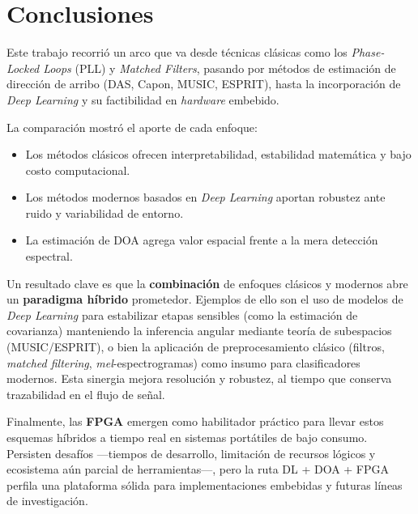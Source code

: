 \section{Conclusiones}\label{sec:conclusiones}

Este trabajo recorrió un arco que va desde técnicas clásicas como los 
\emph{Phase-Locked Loops} (PLL) y \emph{Matched Filters}, pasando por métodos de estimación de dirección de arribo (DAS, Capon, MUSIC, ESPRIT), hasta la incorporación de \emph{Deep Learning} y su factibilidad en \emph{hardware} embebido.  

La comparación mostró el aporte de cada enfoque:  
\begin{itemize}
	\item Los métodos clásicos ofrecen interpretabilidad, estabilidad matemática y bajo costo computacional.  
	\item Los métodos modernos basados en \emph{Deep Learning} aportan robustez ante ruido y variabilidad de entorno.  
	\item La estimación de DOA agrega valor espacial frente a la mera detección espectral.  
\end{itemize}

Un resultado clave es que la \textbf{combinación} de enfoques clásicos y modernos abre un \textbf{paradigma híbrido} prometedor.  
Ejemplos de ello son el uso de modelos de \emph{Deep Learning} para estabilizar etapas sensibles (como la estimación de covarianza) manteniendo la inferencia angular mediante teoría de subespacios (MUSIC/ESPRIT), o bien la aplicación de preprocesamiento clásico (filtros, \emph{matched filtering}, \emph{mel}-espectrogramas) como insumo para clasificadores modernos.  
Esta sinergia mejora resolución y robustez, al tiempo que conserva trazabilidad en el flujo de señal.

Finalmente, las \textbf{FPGA} emergen como habilitador práctico para llevar estos esquemas híbridos a tiempo real en sistemas portátiles de bajo consumo.  
Persisten desafíos —tiempos de desarrollo, limitación de recursos lógicos y ecosistema aún parcial de herramientas—, pero la ruta DL + DOA + FPGA perfila una plataforma sólida para implementaciones embebidas y futuras líneas de investigación.
